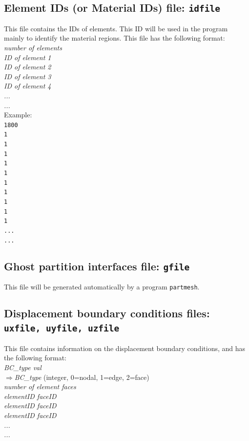 \subsection{Element IDs (or Material IDs) file: \texttt{idfile}}


This file contains the IDs of elements. This ID will be used in the program mainly to identify the material regions. This file has the following format: \\

\emph{number of elements\\
ID of element 1\\
ID of element 2\\
ID of element 3\\
ID of element 4\\
...\\
...}\\

Example:\\

\texttt{1800\\
1\\
1\\
1\\
1\\
1\\
1\\
1\\
1\\
1\\
1\\
...\\
...\\}

\subsection{Ghost partition interfaces file: \texttt{gfile}}


This file will be generated automatically by a program \texttt{partmesh}.\\

\subsection{Displacement boundary conditions files: \texttt{uxfile, uyfile, uzfile}}

This file contains information on the displacement boundary conditions, and has the following format:\\
\emph{BC\_type val}\\
     $\Rightarrow$\emph{BC\_type} (integer, 0=nodal, 1=edge, 2=face)\\
\emph{number of element faces}\\
\emph{elementID faceID \\
elementID faceID \\
elementID faceID \\
...\\
...\\}

